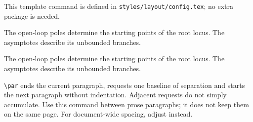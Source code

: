 
\begin{nobreaks}
This template command is defined in
\texttt{styles/layout/config.tex}; no extra package is needed.
\begin{referencecode}
\newcommand{\spacedpar}{\par\addvspace{\baselineskip}\noindent}
\end{referencecode}
\begin{referencecode}
The open-loop poles determine the starting points of the root locus.
\spacedpar The asymptotes describe its unbounded branches.
\end{referencecode}

The open-loop poles determine the starting points of the root locus.
\spacedpar The asymptotes describe its unbounded branches.

\verb|\par| ends the current paragraph,
\texttt{\string\addvspace} requests one baseline of separation and
\texttt{\string\noindent} starts the next paragraph without indentation.
Adjacent \texttt{\string\addvspace} requests do not simply accumulate.
Use this command between prose paragraphs; it does not keep them on
the same page. For document-wide spacing, adjust
\texttt{\string\parskip} instead.
\end{nobreaks}
